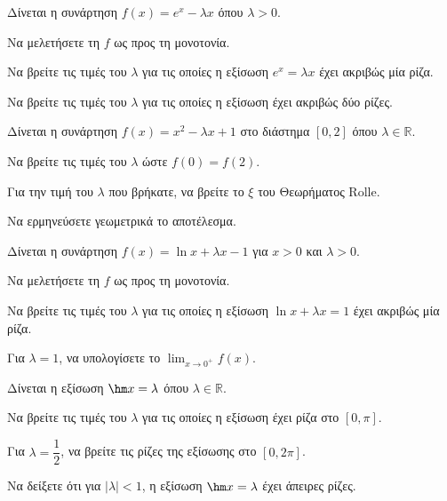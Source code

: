 \documentclass[11pt,a4paper,modern]{FFExercises}
\begin{document}
\askhsh
Δίνεται η συνάρτηση $f(x) = e^x - \lambda x$ όπου $\lambda > 0$.
\begin{alist}
  \item Να μελετήσετε τη $f$ ως προς τη μονοτονία.
  \item Να βρείτε τις τιμές του $\lambda$ για τις οποίες η εξίσωση $e^x = \lambda x$ έχει ακριβώς μία ρίζα.
  \item Να βρείτε τις τιμές του $\lambda$ για τις οποίες η εξίσωση έχει ακριβώς δύο ρίζες.
\end{alist}

\askhsh
Δίνεται η συνάρτηση $f(x) = x^2 - \lambda x + 1$ στο διάστημα $[0, 2]$ όπου $\lambda \in \mathbb{R}$.
\begin{alist}
  \item Να βρείτε τις τιμές του $\lambda$ ώστε $f(0) = f(2)$.
  \item Για την τιμή του $\lambda$ που βρήκατε, να βρείτε το $\xi$ του Θεωρήματος Rolle.
  \item Να ερμηνεύσετε γεωμετρικά το αποτέλεσμα.
\end{alist}

\askhsh
Δίνεται η συνάρτηση $f(x) = \ln x + \lambda x - 1$ για $x > 0$ και $\lambda > 0$.
\begin{alist}
  \item Να μελετήσετε τη $f$ ως προς τη μονοτονία.
  \item Να βρείτε τις τιμές του $\lambda$ για τις οποίες η εξίσωση $\ln x + \lambda x = 1$ έχει ακριβώς μία ρίζα.
  \item Για $\lambda = 1$, να υπολογίσετε το $\displaystyle\lim_{x \to 0^+} f(x)$.
\end{alist}

\askhsh
Δίνεται η εξίσωση $\hm x = \lambda$ όπου $\lambda \in \mathbb{R}$.
\begin{alist}
  \item Να βρείτε τις τιμές του $\lambda$ για τις οποίες η εξίσωση έχει ρίζα στο $[0, \pi]$.
  \item Για $\lambda = \dfrac{1}{2}$, να βρείτε τις ρίζες της εξίσωσης στο $[0, 2\pi]$.
  \item Να δείξετε ότι για $|\lambda| < 1$, η εξίσωση $\hm x = \lambda$ έχει άπειρες ρίζες.
\end{alist}

\end{document}
